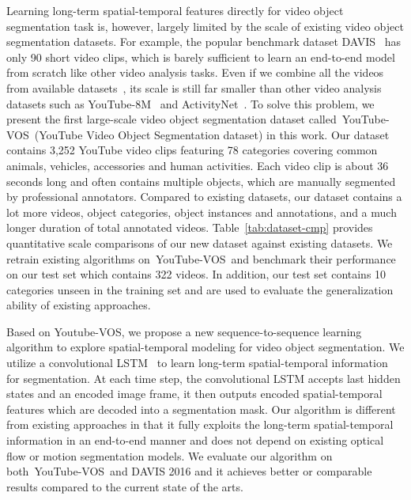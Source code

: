 \documentclass[runningheads]{llncs}
\newcommand{\dataset}{YouTube-VOS}
\begin{document}
Learning long-term spatial-temporal features directly for video object segmentation task is, however, largely limited by the scale of existing video object segmentation datasets. For example, the popular benchmark dataset DAVIS~\cite{Pont-Tuset2017davis} has only 90 short video clips, which is barely sufficient to learn an end-to-end model from scratch like other video analysis tasks. Even if we combine all the videos from available datasets~\cite{Jain2014youtubeobjects,jumpcut,Fli2013segtrack,brox2010BMS,ochs2014FBMS,galasso2013VSB100}, its scale is still far smaller than other video analysis datasets such as YouTube-8M~\cite{abu2016youtube} and ActivityNet~\cite{heilbron2015activitynet}. To solve this problem, we present the first large-scale video object segmentation dataset called~\dataset~(YouTube Video Object Segmentation dataset) in this work. Our dataset contains 3,252 YouTube video clips featuring 78 categories covering common animals, vehicles, accessories and human activities. Each video clip is about 36 seconds long and often contains multiple objects, which are manually segmented by professional annotators. Compared to existing datasets, our dataset contains a lot more videos, object categories, object instances and annotations, and a much longer duration of total annotated videos. Table~\ref{tab:dataset-cmp} provides quantitative scale comparisons of our new dataset against existing datasets. We retrain existing algorithms on~\dataset~and benchmark their performance on our test set which contains 322 videos. In addition, our test set contains 10 categories unseen in the training set and are used to evaluate the generalization ability of existing approaches. 



















Based on Youtube-VOS, we propose a new sequence-to-sequence learning algorithm to explore spatial-temporal modeling for video object segmentation. We utilize a convolutional LSTM~\cite{xingjian2015convolutional} to learn long-term spatial-temporal information for segmentation. At each time step, the convolutional LSTM accepts last hidden states and an encoded image frame, it then outputs encoded spatial-temporal features which are decoded into a segmentation mask. Our algorithm is different from existing approaches in that it fully exploits the long-term spatial-temporal information in an end-to-end manner and does not depend on existing optical flow or motion segmentation models. We evaluate our algorithm on both~\dataset~and DAVIS 2016 and it achieves better or comparable results compared to the current state of the arts.
\end{document}
